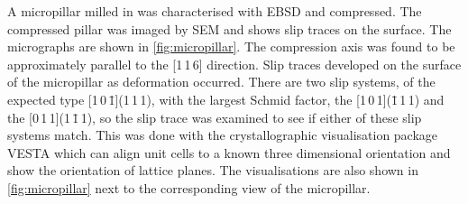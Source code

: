 A micropillar milled in  was characterised with EBSD and compressed. The compressed pillar was imaged by SEM and shows slip traces on the surface. The micrographs are shown in \autoref{fig:micropillar}. The compression axis was found to be approximately parallel to the [1\,1\,6] direction. Slip traces developed on the surface of the micropillar as deformation occurred. There are two slip systems, of the expected type [1\,0\,\={1}](1\,1\,1), with the largest Schmid factor, the [1\,0\,1](\={1}\,1\,1) and the [0\,1\,1](1\,\={1}\,1), so the slip trace was examined to see if either of these slip systems match. This was done with the crystallographic visualisation package VESTA \cite{Momma2011,Momma2014} which can align unit cells to a known three dimensional orientation and show the orientation of lattice planes. The visualisations are also shown in \autoref{fig:micropillar} next to the corresponding view of the micropillar.

